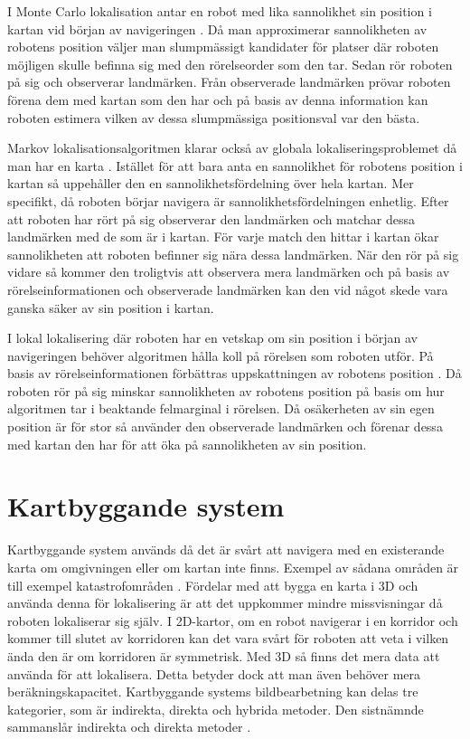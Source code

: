 I Monte Carlo lokalisation antar en robot med lika sannolikhet sin position i kartan vid början av navigeringen \citep{montecarlo}. Då man approximerar sannolikheten av robotens position väljer man slumpmässigt kandidater för platser där roboten möjligen skulle befinna sig med den rörelseorder som den tar. Sedan rör roboten på sig och observerar landmärken. Från observerade landmärken prövar roboten förena dem med kartan som den har och på basis av denna information kan roboten estimera vilken av dessa slumpmässiga positionsval var den bästa. 

Markov lokalisationsalgoritmen klarar också av globala lokaliseringsproblemet då man har en karta \citep{ProbabilisticRobotics}. Istället för att bara anta en sannolikhet för robotens position i kartan så uppehåller den en sannolikhetsfördelning över hela kartan. Mer specifikt, då roboten börjar navigera är sannolikhetsfördelningen enhetlig. Efter att roboten har rört på sig observerar den landmärken och matchar dessa landmärken med de som är i kartan. För varje match den hittar i kartan ökar sannolikheten att roboten befinner sig nära dessa landmärken. När den rör på sig vidare så kommer den troligtvis att observera mera landmärken och på basis av rörelseinformationen och observerade landmärken kan den vid något skede vara ganska säker av sin position i kartan.

I lokal lokalisering där roboten har en vetskap om sin position i början av navigeringen behöver algoritmen hålla koll på rörelsen som roboten utför. På basis av rörelseinformationen förbättras uppskattningen av robotens position \citep{montecarlo,ProbabilisticRobotics}. Då roboten rör på sig minskar sannolikheten av robotens position på basis om hur algoritmen tar i beaktande felmarginal i rörelsen. Då osäkerheten av sin egen position är för stor så använder den observerade landmärken och förenar dessa med kartan den har för att öka på sannolikheten av sin position. 

\section{Kartbyggande system}

Kartbyggande system används då det är svårt att navigera med en existerande karta om omgivningen eller om kartan inte finns. Exempel av sådana områden är till exempel katastrofområden \citep{geospatial}. Fördelar med att bygga en karta i 3D och använda denna för lokalisering är att det uppkommer mindre missvisningar då roboten lokaliserar sig själv. I 2D-kartor, om en robot navigerar i en korridor och kommer till slutet av korridoren kan det vara svårt för roboten att veta i vilken ända den är om korridoren är symmetrisk. Med 3D så finns det mera data att använda för att lokalisera. Detta betyder dock att man även behöver mera beräkningskapacitet. Kartbyggande systems bildbearbetning kan delas tre kategorier, som är indirekta, direkta och hybrida metoder. Den sistnämnde sammanslår indirekta och direkta metoder \citep{geospatial}.

